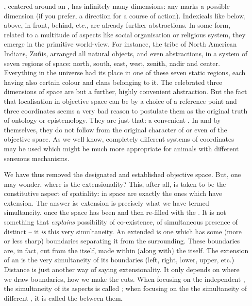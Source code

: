 \pa {}, centered around an  , has infinitely
many dimensions: any  marks a possible dimension (if you prefer, a
direction for a course of action). Indexicals like below, above, in front,
behind, etc., are already further abstractions. In some form, related to a
multitude of aspects like social organisation or religious system, they emerge
in the primitive world-view. For instance, the tribe of North American Indians,
Zu\~{n}is, arranged all natural objects, and even abstractions, in a system of
seven regions of space: north, south, east, west, zenith, nadir and center.
Everything in the universe had its place in one of these seven static regions,
each having also certain colour and clans belonging to it. The
celebrated three dimensions of space are but a further, highly convenient
abstraction. But the fact that localisation in objective space can be
 by a choice of a reference point and three coordinates seems a
very bad reason to postulate them as the original truth of ontology or
epistemology.  They are just that: a convenient .  In and by
themselves, they do not follow from the original character of  or
even of the objective space. As we well know, completely different systems of
coordinates may be used which might be much more appropriate for animals with
different sensuous mechanisms.

\pa We have thus removed the designated  and established objective
space. But, one may wonder, where is the extensionality?  This, after all, is
taken to be the constitutive aspect of spatiality:  in space are
exactly the ones which have extension. The answer is: extension is precisely
what we have termed simultaneity, once the space has been  and
then re-filled with the . It is not something that {\em explains}
possibility of co-existence, of simultaneous presence of distinct 
-- it {\em is} this very simultaneity. An extended  is one which has
some (more or less sharp) boundaries separating it from the surrounding.  These
boundaries are, in fact, {cut} from the  itself,
 made within (along with) the  itself.
The extension of an  is the very simultaneity of its boundaries
(left, right, lower, upper, etc.) Distance is just another way of saying
extensionality. It only depends on where we draw boundaries, how we make the
{cuts}. When focusing on the independent , the simultaneity of
its aspects is called ; when focusing on the the simultaneity
of different , it is called the  between them.

